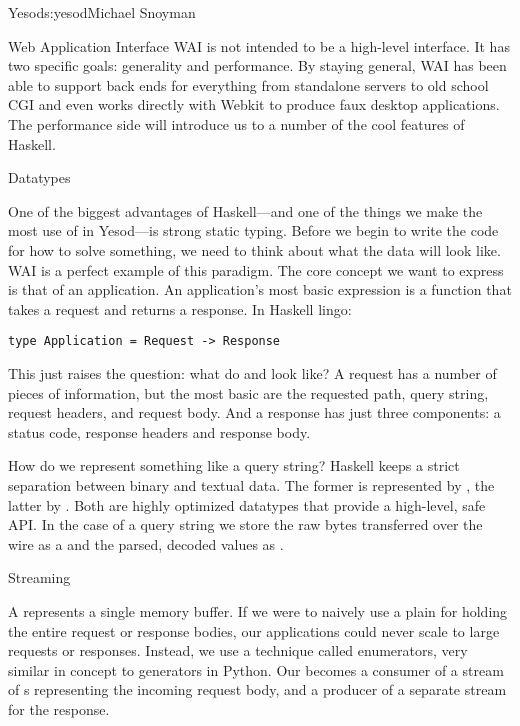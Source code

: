 \begin{aosachapter}{Yesod}{s:yesod}{Michael Snoyman}
\begin{aosasect1}{Web Application Interface}
WAI is not intended to be a high-level interface. It has two specific
goals: generality and performance. By staying general, WAI has been
able to support back ends for everything from standalone servers to old
school CGI and even works directly with Webkit to produce faux desktop
applications. The performance side will introduce us to a number of
the cool features of Haskell.


\begin{aosasect2}{Datatypes}

One of the biggest advantages of Haskell---and one of the things we
make the most use of in Yesod---is strong static typing. Before we
begin to write the code for how to solve something, we need to think
about what the data will look like. WAI is a perfect example of this
paradigm. The core concept we want to express is that of an
application. An application's most basic expression is a function that
takes a request and returns a response. In Haskell lingo:

\begin{verbatim}
type Application = Request -> Response
\end{verbatim}

This just raises the question: what do  and  look like?
A request has a number of pieces of information, but the most basic
are the requested path, query string, request headers, and request
body. And a response has just three components: a status code,
response headers and response body.

How do we represent something like a query string? Haskell keeps a
strict separation between binary and textual data. The former is
represented by , the latter by . Both are highly
optimized datatypes that provide a high-level, safe API. In the case
of a query string we store the raw bytes transferred over the wire as a
 and the parsed, decoded values as .

\end{aosasect2}

\begin{aosasect2}{Streaming}

A  represents a single memory buffer. If we were to naively
use a plain  for holding the entire request or response
bodies, our applications could never scale to large requests or
responses. Instead, we use a technique called enumerators, very
similar in concept to generators in Python. Our  becomes a
consumer of a stream of s representing the incoming request
body, and a producer of a separate stream for the response.


\end{aosasect2}
\end{aosasect1}
\end{aosachapter}
